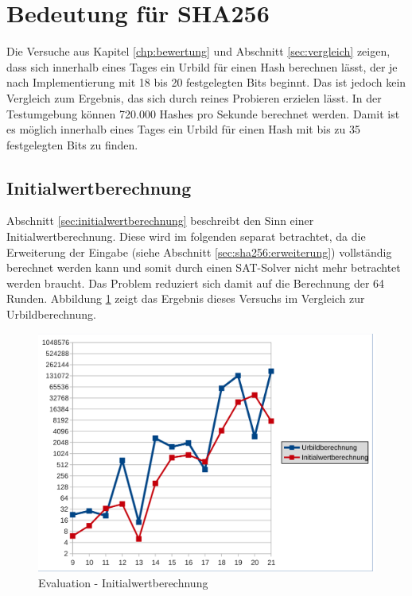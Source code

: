 \section{Bedeutung für SHA256}

Die Versuche aus Kapitel \ref{chp:bewertung} und Abschnitt \ref{sec:vergleich} zeigen, dass sich innerhalb eines Tages
ein Urbild für einen Hash berechnen lässt, der je nach Implementierung mit 18 bis 20 festgelegten Bits beginnt. Das ist jedoch
kein Vergleich zum Ergebnis, das sich durch reines Probieren erzielen lässt. In der Testumgebung können 720.000 Hashes pro Sekunde
berechnet werden. Damit ist es möglich innerhalb eines Tages ein Urbild für einen Hash mit bis zu 35 festgelegten Bits zu finden.

\subsection{Initialwertberechnung}
Abschnitt \ref{sec:initialwertberechnung} beschreibt den Sinn einer Initialwertberechnung. Diese wird im folgenden separat
betrachtet, da die Erweiterung der Eingabe (siehe Abschnitt \ref{sec:sha256:erweiterung}) vollständig berechnet werden kann
und somit durch einen SAT-Solver nicht mehr betrachtet werden braucht. Das Problem reduziert sich damit auf die Berechnung
der 64 Runden. Abbildung \ref{fig:eval_initial} zeigt das Ergebnis dieses Versuchs im Vergleich zur Urbildberechnung.
\begin{figure}[!h]
  \centering
  \includegraphics[scale=0.55]{images/eval_initial}
  \caption{Evaluation - Initialwertberechnung}
  \label{fig:eval_initial}
\end{figure}

